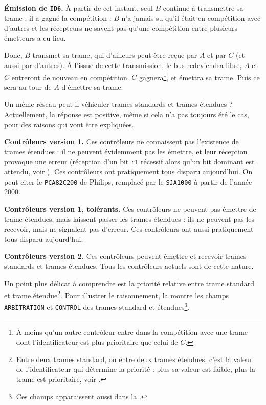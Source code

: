 {\bf Émission de \texttt{ID6}.}  À partir de cet instant, seul $B$ continue à transmettre sa trame : il a gagné la compétition : $B$ n'a jamais su qu'il était en compétition avec d'autres et les récepteurs ne savent pas qu'une compétition entre plusieurs émetteurs a eu lieu.

Donc, $B$ transmet sa trame, qui d'ailleurs peut être reçue par $A$ et par $C$ (et aussi par d'autres). À l'issue de cette transmission, le bus redeviendra libre, $A$ et $C$ entreront de nouveau en compétition. $C$ gagnera\footnote{À moins qu'un autre contrôleur entre dans la compétition avec une trame dont l'identificateur est plus prioritaire que celui de $C$.}, et émettra sa trame. Puis ce sera au tour de $A$ d'émettre sa trame.




Un même réseau peut-il véhiculer trames standards et trames étendues ? Actuellement, la réponse est positive, même si cela n'a pas toujours été le cas, pour des raisons qui vont être expliquées.

{\bf Contrôleurs version 1.} Ces contrôleurs ne connaissent pas l'existence de trames étendues : il ne peuvent évidemment pas les émettre, et leur réception provoque une erreur (réception d'un bit \texttt{r1} récessif alors qu'un bit dominant est attendu, voir ). Ces contrôleurs ont pratiquement tous disparu aujourd'hui. On peut citer le \texttt{PCA82C200} de Philips, remplacé par le \texttt{SJA1000} à partir de l'année 2000.

{\bf Contrôleurs version 1, tolérants.} Ces contrôleurs ne peuvent pas émettre de trame étendues, mais laissent passer les trames étendues : ils ne peuvent pas les recevoir, mais ne signalent pas d'erreur. Ces contrôleurs ont aussi pratiquement tous disparu aujourd'hui.

{\bf Contrôleurs version 2.} Ces contrôleurs peuvent émettre et recevoir trames standards et trames étendues. Tous les contrôleurs actuels sont de cette nature.

Un point plus délicat à comprendre est la priorité relative entre trame standard et trame étendue\footnote{Entre deux trames standard, ou entre deux trames étendues, c'est la valeur de l'identificateur qui détermine la priorité : plus sa valeur est faible, plus la trame est prioritaire, voir .}. Pour illustrer le raisonnement, la  montre les champs \texttt{ARBITRATION} et \texttt{CONTROL} des trames standard et étendues\footnote{Ces champs apparaissent aussi dans la .}.

